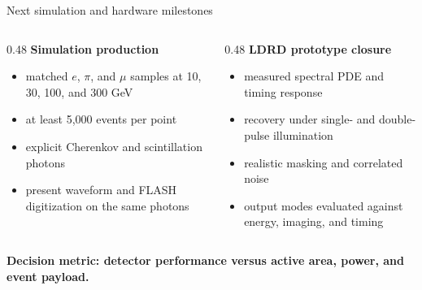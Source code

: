\documentclass[10pt,aspectratio=169,t]{beamer}
\newcommand{\red}[1]{\textcolor{TTURed}{\bfseries #1}}
\newcommand{\tightitem}{\setlength\itemsep{0.32em}\setlength\parskip{0pt}}
\begin{document}
\begin{frame}{Next simulation and hardware milestones}
  \begin{columns}[T,onlytextwidth]
    \begin{column}{0.48\textwidth}
      {\large\bfseries Simulation production}\par
      \vspace{0.14cm}
      \begin{itemize}\tightitem
        \item matched $e$, $\pi$, and $\mu$ samples at 10, 30, 100, and 300 GeV
        \item at least 5,000 events per point
        \item explicit Cherenkov and scintillation photons
        \item present waveform and FLASH digitization on the same photons
      \end{itemize}
    \end{column}
    \begin{column}{0.48\textwidth}
      {\large\bfseries LDRD prototype closure}\par
      \vspace{0.14cm}
      \begin{itemize}\tightitem
        \item measured spectral PDE and timing response
        \item recovery under single- and double-pulse illumination
        \item realistic masking and correlated noise
        \item output modes evaluated against energy, imaging, and timing
      \end{itemize}
    \end{column}
  \end{columns}
  \vspace{0.28cm}
  \centering\red{Decision metric: detector performance versus active area, power, and event payload.}
\end{frame}
\end{document}
